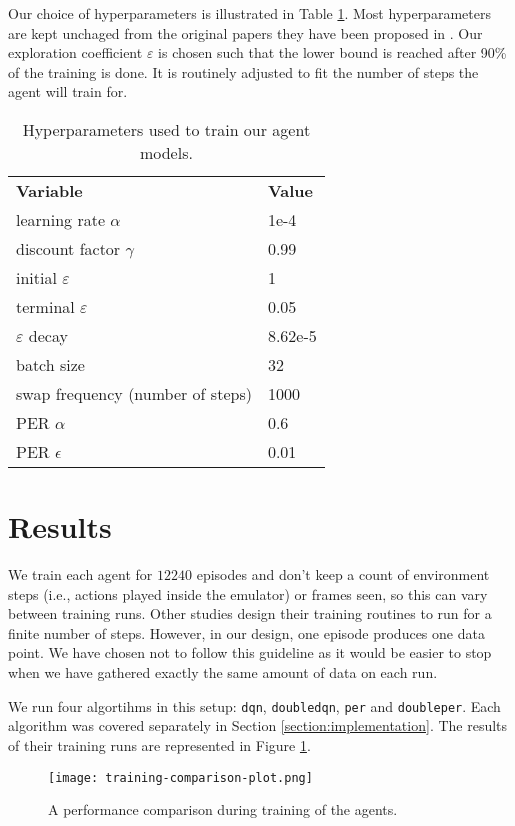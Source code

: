 Our choice of hyperparameters is illustrated in Table \ref{tab:our-hyperparameters}.
Most hyperparameters are kept unchaged from the original papers they have been proposed in \cite{atari-dqn, per-paper}.
Our exploration coefficient $\varepsilon$ is chosen such that the lower bound is reached after 90\% of the training is done.
It is routinely adjusted to fit the number of steps the agent will train for.

\begin{table}
    \centering
        \begin{tabular}{ll}
            \textbf{Variable}                  & \textbf{Value}   \\
            learning rate $\alpha$             & 1e-4    \\
            discount factor $\gamma$           & 0.99    \\
            initial $\varepsilon$              & 1       \\
            terminal $\varepsilon$             & 0.05    \\
            $\varepsilon$ decay                & 8.62e-5 \\
            batch size                         & 32      \\
            swap frequency (number of steps)   & 1000    \\
            PER $\alpha$                       & 0.6     \\
            PER $\epsilon$                     & 0.01    \\
        \end{tabular}%
        \caption{Hyperparameters used to train our agent models.}
    \label{tab:our-hyperparameters}
\end{table}

\section*{Results}
We train each agent for $12240$ episodes and don't keep a count of environment steps (i.e., actions played inside the emulator) or frames seen, so this can vary between training runs.
Other studies design their training routines to run for a finite number of steps.
However, in our design, one episode produces one data point. We have chosen not to follow this guideline as it would be easier to stop when we have gathered exactly the same amount of data on each run.

We run four algortihms in this setup: \texttt{dqn}, \texttt{doubledqn}, \texttt{per} and \texttt{doubleper}.
Each algorithm was covered separately in Section \ref{section:implementation}.
The results of their training runs are represented in Figure \ref{fig:training-results}.

\begin{figure}[h]
    \centering
    \texttt{[image: training-comparison-plot.png]}
    \caption{A performance comparison during training of the agents.}
    \label{fig:training-results}
\end{figure}